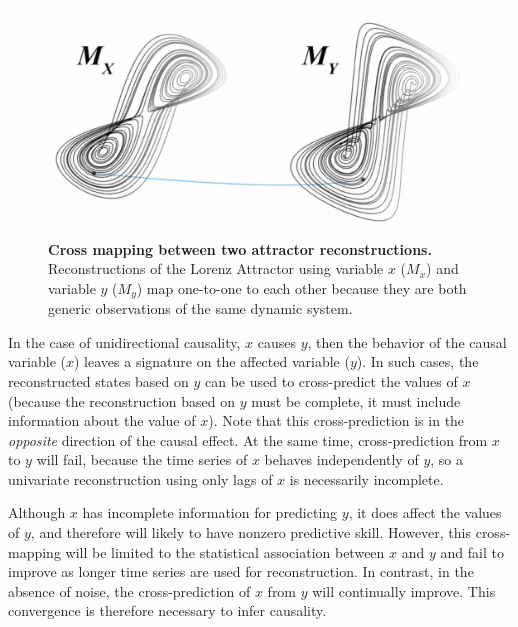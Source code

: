 \begin{figure}[!ht]
\begin{center}\includegraphics[width=\maxwidth{\textwidth}]{fig_redm_7.png}\end{center}
\caption[Cross mapping between two attractor reconstructions.]{\textbf{Cross mapping between two attractor reconstructions.}\newline
Reconstructions of the Lorenz Attractor using variable $x$ ($M_x$) and variable $y$ ($M_y$) map one-to-one to each other because they are both generic observations of the same dynamic system.}
\end{figure}

In the case of unidirectional causality, $x$ causes $y$, then the behavior of the causal variable ($x$) leaves a signature on the affected variable ($y$). In such cases, the reconstructed states based on $y$ can be used to cross-predict the values of $x$ (because the reconstruction based on $y$ must be complete, it must include information about the value of $x$). Note that this cross-prediction is in the \emph{opposite} direction of the causal effect. At the same time, cross-prediction from $x$ to $y$ will fail, because the time series of $x$ behaves independently of $y$, so a univariate reconstruction using only lags of $x$ is necessarily incomplete.

Although $x$ has incomplete information for predicting $y$, it does affect the values of $y$, and therefore will likely to have nonzero predictive skill. However, this cross-mapping will be limited to the statistical association between $x$ and $y$ and fail to improve as longer time series are used for reconstruction. In contrast, in the absence of noise, the cross-prediction of $x$ from $y$ will continually improve. This convergence is therefore necessary to infer causality. 

